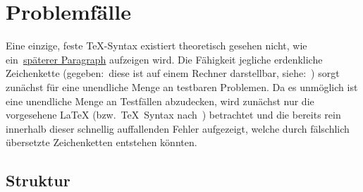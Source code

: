 \section{Problemfälle}
Eine einzige, feste \TeX{}-Syntax existiert theoretisch gesehen nicht, wie ein~\hyperref[problems:advanced:catcode]{späterer Paragraph} aufzeigen wird.%
Die Fähigkeit jegliche erdenkliche Zeichenkette (gegeben:\ diese ist auf einem Rechner darstellbar, siehe:~\cite{unicode}) sorgt zunächst für eine unendliche Menge an testbaren Problemen. Da es unmöglich ist eine unendliche Menge an Testfällen abzudecken, wird zunächst nur die vorgesehene \LaTeX{} (bzw.\ \TeX{}~Syntax nach~\cite{texbook}) betrachtet und die bereits rein innerhalb dieser schnellig auffallenden Fehler aufgezeigt, welche durch fälschlich übersetzte Zeichenketten entstehen könnten.\\\noindent
% 
\subsection{Struktur}\label{problems:structure}%
